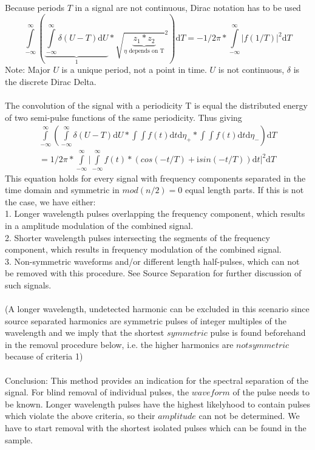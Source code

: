 \documentclass{report}
\begin{document}
Because periods $T$ in a signal are not continuous, Dirac notation has to be used
\begin{equation}
\int\limits_{-\infty}^{\infty} (\underbrace{\int\limits_{-\infty}^{\infty} \delta (U - T) \mathrm{d} U}_{1} * \sqrt{ \underbrace{z_{1}*z_{2}}_{\text{$\eta$ depends on T}} }^2 )\mathrm{d} T = -1/2\pi * \int\limits_{-\infty}^{\infty} \vert\hat{f}(1/T)\vert ^2 \mathrm{d} T
\end{equation}
Note: Major $U$ is a unique period, not a point in time. $U$ is not continuous, $\delta$ is the discrete Dirac Delta.\\\\
The convolution of the signal with a periodicity T is equal the distributed energy of two semi-pulse functions of the same periodicity. Thus giving
\begin{align*}
\int\limits_{-\infty}^{\infty}(\int\limits_{-\infty}^{\infty} \delta (U - T) \mathrm{d} U * \int \int f(t) \mathrm{d} t \mathrm{d} \eta_{+}*\int \int f(t) \mathrm{d} t \mathrm{d} \eta_{-} ) \mathrm{d} T \\= 1/2\pi * \int\limits_{-\infty}^{\infty} \vert \int\limits_{-\infty}^{\infty}  f(t) * (cos(-t/T)+\mathrm{i} sin(-t/T)) \mathrm{d} t \vert^2 \mathrm{d} T
\end{align*}
This equation holds for every signal with frequency components separated in the time domain and symmetric in $mod(n/2)=0$ equal length parts. If this is not the case, we have either:\\
1. Longer wavelength pulses overlapping the frequency component, which results in a amplitude modulation of the combined signal.\\
2. Shorter wavelength pulses intersecting the segments of the frequency component, which results in frequency modulation of the combined signal.\\
3. Non-symmetric waveforms and/or different length half-pulses, which can not be removed with this procedure. See Source Separation for further discussion of such signals.\\\\
(A longer wavelength, undetected harmonic can be excluded in this scenario since source separated harmonics are symmetric pulses of integer multiples of the wavelength and we imply that the shortest $symmetric$ pulse is found beforehand in the removal procedure below, i.e. the higher harmonics are $not symmetric$ because of criteria 1)\\\\
Conclusion: This method provides an indication for the spectral separation of the signal. For blind removal of individual pulses, the $waveform$ of the pulse needs to be known. Longer wavelength pulses have the highest likelyhood to contain pulses which violate the above criteria, so their $amplitude$ can not be determined. We have to start removal with the shortest isolated pulses which can be found in the sample.\\\\
\end{document}
